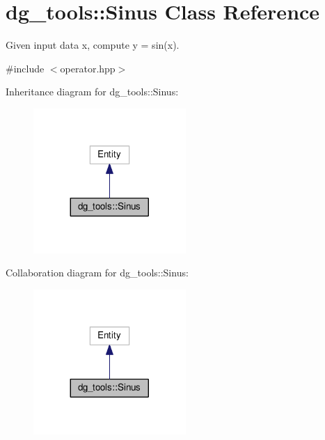 \hypertarget{classdg__tools_1_1Sinus}{}\section{dg\+\_\+tools\+:\+:Sinus Class Reference}
\label{classdg__tools_1_1Sinus}


Given input data x, compute y = sin(x).  




{\ttfamily \#include $<$operator.\+hpp$>$}



Inheritance diagram for dg\+\_\+tools\+:\+:Sinus\+:
\nopagebreak
\begin{figure}[H]
\begin{center}
\leavevmode
\includegraphics[width=164pt]{classdg__tools_1_1Sinus__inherit__graph}
\end{center}
\end{figure}


Collaboration diagram for dg\+\_\+tools\+:\+:Sinus\+:
\nopagebreak
\begin{figure}[H]
\begin{center}
\leavevmode
\includegraphics[width=164pt]{classdg__tools_1_1Sinus__coll__graph}
\end{center}
\end{figure}
